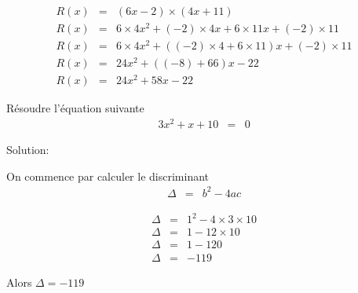 \documentclass[a4paper,10pt]{/media/documents/Cours/Prof/Enseignements/Archive/2013-2014/tools/style/classDS}
\begin{document}
\begin{Exo}[4.5]
        \begin{eqnarray*}
R(x) & = & ( 6 x - 2 ) \times ( 4 x + 11 ) \\ 
R(x) & = & 6 \times 4 x^{  2 } + ( -2 ) \times 4 x + 6 \times 11 x + ( -2 ) \times 11 \\ 
R(x) & = & 6 \times 4 x^{  2 } + ( ( -2 ) \times 4 + 6 \times 11 ) x + ( -2 ) \times 11 \\ 
R(x) & = & 24 x^{  2 } + ( ( -8 ) + 66 ) x - 22 \\ 
R(x) & = & 24 x^{  2 } + 58 x - 22
\end{eqnarray*}


\end{Exo}

\begin{Exo}
    
    Résoudre l'équation suivante
    \begin{eqnarray*}
        3 x^{  2 } + x + 10 & = & 0
    \end{eqnarray*}

    Solution:

    On commence par calculer le discriminant
    \begin{eqnarray*}
        \Delta & = & b^2-4ac
    \end{eqnarray*}
    
    \begin{eqnarray*}
\Delta & = & 1^{  2 } - 4 \times 3 \times 10 \\ 
\Delta & = & 1 - 12 \times 10 \\ 
\Delta & = & 1 - 120 \\ 
\Delta & = & -119
\end{eqnarray*}

    
    Alors $\Delta = -119$
    
    
\end{Exo}
\end{document}
